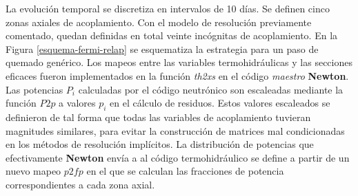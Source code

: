 La evolución temporal se discretiza en intervalos de 10 días.
Se definen cinco zonas axiales de acoplamiento.
Con el modelo de resolución previamente comentado, quedan definidas en total veinte incógnitas de acoplamiento.
En la Figura \ref{esquema-fermi-relap} se esquematiza la estrategia para un paso de quemado genérico.
Los mapeos entre las variables termohidráulicas y las secciones eficaces fueron implementados en la función \textit{th2xs} en el código \textit{maestro} \textbf{Newton}.
Las potencias $P_i$ calculadas por el código neutrónico son escaleadas mediante la función $P2p$ a valores $p_i$ en el cálculo de residuos.
Estos valores escaleados se definieron de tal forma que todas las variables de acoplamiento tuvieran magnitudes similares,
para evitar la construcción de matrices mal condicionadas en los métodos de resolución implícitos.
La distribución de potencias que efectivamente \textbf{Newton} envía a al código termohidráulico se define a partir de un nuevo mapeo $p2fp$
en el que se calculan las fracciones de potencia correspondientes a cada zona axial.


